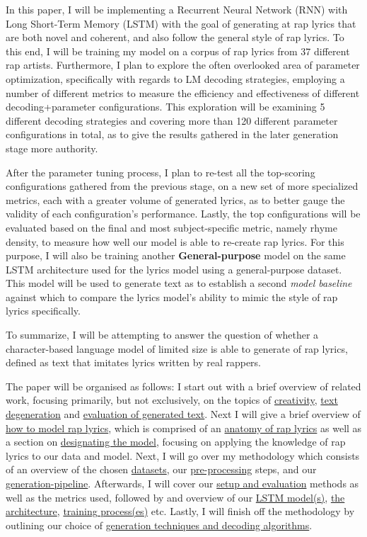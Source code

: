 In this paper, I will be implementing a Recurrent Neural Network (RNN) with Long Short-Term Memory (LSTM) with the goal of generating at rap lyrics that are both novel and coherent, and also follow the general style of rap lyrics. To this end, I will be training my model on a corpus of rap lyrics from 37 different rap artists. Furthermore, I plan to explore the often overlooked area of parameter optimization, specifically with regards to LM decoding strategies, employing a number of different metrics to measure the efficiency and effectiveness of different decoding+parameter configurations. This exploration will be examining 5 different decoding strategies and covering more than 120 different parameter configurations in total, as to give the results gathered in the later generation stage more authority.

After the parameter tuning process, I plan to re-test all the top-scoring configurations gathered from the previous stage, on a new set of more specialized metrics, each with a greater volume of generated lyrics, as to better gauge the validity of each configuration’s performance. Lastly, the top configurations will be evaluated based on the final and most subject-specific metric, namely rhyme density, to measure how well our model is able to re-create rap lyrics. For this purpose, I will also be training another \textbf{General-purpose} model on the same LSTM architecture used for the lyrics model using a general-purpose dataset. This model will be used to generate text as to establish a second \textit{model baseline} against which to compare the lyrics model's ability to mimic the style of rap lyrics specifically. 

To summarize, I will be attempting to answer the question of whether a character-based language model of limited size is able to generate of rap lyrics, defined as text that imitates lyrics written by real rappers.

The paper will be organised as follows: I start out with a brief overview of related work, focusing primarily, but not exclusively, on the topics of \hyperref[sec:creativity+nlg]{creativity}, \hyperref[sec:text-degeneration]{text degeneration} and \hyperref[sec:eval-of-generated-text]{evaluation of generated text}. Next I will give a brief overview of \hyperref[sec:modelling-rap]{how to model rap lyrics}, which is comprised of an \hyperref[sec:anatomy-of-rap]{anatomy of rap lyrics} as well as a section on \hyperref[sec:design-adaptation]{designating the model}, focusing on applying the knowledge of rap lyrics to our data and model. Next, I will go over my methodology which consists of an overview of the chosen \hyperref[sec:datasets]{datasets}, our \hyperref[sec:pre-processing]{pre-processing} steps, and our \hyperref[sec:generation-pipeline]{generation-pipeline}. Afterwards, I will cover our \hyperref[sec:setup+eval]{setup and evaluation} methods as well as the metrics used, followed by and overview of our \hyperref[sec:lstm-model]{LSTM model(s)}, \hyperref[sec:model-architecture]{the architecture}, \hyperref[sec:model-training]{training process(es)} etc. Lastly, I will finish off the methodology by outlining our choice of \hyperref[sec:generation-techs]{generation techniques and decoding algorithms}.

